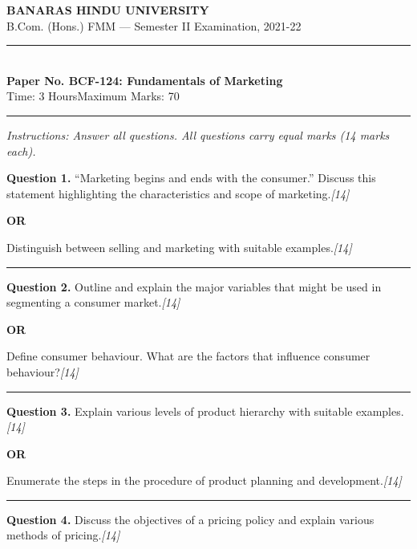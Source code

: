 \documentclass[11pt,a4paper]{article}
\newcommand{\pts}[1]{\hfill   \textit{[#1]}}
\begin{document}
\begin{center}
  {\large\bfseries BANARAS HINDU UNIVERSITY}\\[2pt]
  {\normalsize B.Com. (Hons.) FMM --- Semester II Examination, 2021-22}\\[6pt]
  \rule{0.8\linewidth}{0.5pt}\\[6pt]
  {\large\bfseries Paper No. BCF-124: Fundamentals of Marketing}\\[4pt]
  {\normalsize Time: 3 Hours\hfill Maximum Marks: 70}
\end{center}

\rule{\linewidth}{0.4pt}

\smallskip



\noindent   \textit{Instructions: Answer all questions. All questions carry equal marks (14 marks each).}

\bigskip




\noindent   \textbf{Question 1.}
``Marketing begins and ends with the consumer.'' Discuss this statement highlighting the characteristics and scope of marketing.\pts{14}

\centerline{   \textbf{OR}}

Distinguish between selling and marketing with suitable examples.\pts{14}

\medskip\rule{\linewidth}{0.2pt}




\noindent   \textbf{Question 2.}
Outline and explain the major variables that might be used in segmenting a consumer market.\pts{14}

\centerline{   \textbf{OR}}

Define consumer behaviour. What are the factors that influence consumer behaviour?\pts{14}

\medskip\rule{\linewidth}{0.2pt}




\noindent   \textbf{Question 3.}
Explain various levels of product hierarchy with suitable examples.\pts{14}

\centerline{   \textbf{OR}}

Enumerate the steps in the procedure of product planning and development.\pts{14}

\medskip\rule{\linewidth}{0.2pt}




\noindent   \textbf{Question 4.}
Discuss the objectives of a pricing policy and explain various methods of pricing.\pts{14}
\end{document}
